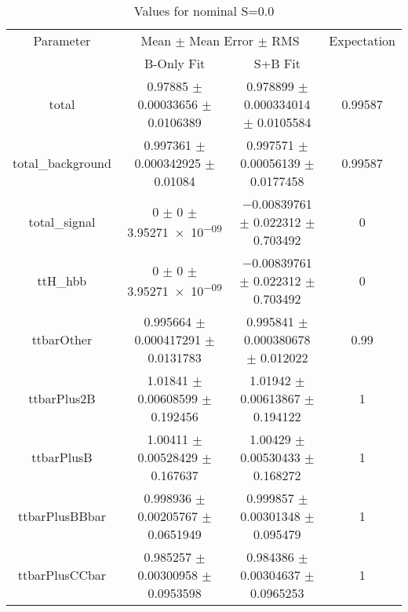 \begin{table}
\centering
\caption{Values for nominal S=0.0}
\begin{tabular}{cccc}
\toprule
Parameter & \multicolumn{2}{c}{Mean $\pm$ Mean Error $\pm$ RMS} & Expectation\\
 & B-Only Fit & S+B Fit & \\
\midrule
total & \num{0.97885} $\pm$ \num{0.00033656} $\pm$ \num{0.0106389} & \num{0.978899} $\pm$ \num{0.000334014} $\pm$ \num{0.0105584} & \num{0.99587}\\
total\_background & \num{0.997361} $\pm$ \num{0.000342925} $\pm$ \num{0.01084} & \num{0.997571} $\pm$ \num{0.00056139} $\pm$ \num{0.0177458} & \num{0.99587}\\
total\_signal & \num{0} $\pm$ \num{0} $\pm$ \num{3.95271e-09} & \num{-0.00839761} $\pm$ \num{0.022312} $\pm$ \num{0.703492} & \num{0}\\
ttH\_hbb & \num{0} $\pm$ \num{0} $\pm$ \num{3.95271e-09} & \num{-0.00839761} $\pm$ \num{0.022312} $\pm$ \num{0.703492} & \num{0}\\
ttbarOther & \num{0.995664} $\pm$ \num{0.000417291} $\pm$ \num{0.0131783} & \num{0.995841} $\pm$ \num{0.000380678} $\pm$ \num{0.012022} & \num{0.99}\\
ttbarPlus2B & \num{1.01841} $\pm$ \num{0.00608599} $\pm$ \num{0.192456} & \num{1.01942} $\pm$ \num{0.00613867} $\pm$ \num{0.194122} & \num{1}\\
ttbarPlusB & \num{1.00411} $\pm$ \num{0.00528429} $\pm$ \num{0.167637} & \num{1.00429} $\pm$ \num{0.00530433} $\pm$ \num{0.168272} & \num{1}\\
ttbarPlusBBbar & \num{0.998936} $\pm$ \num{0.00205767} $\pm$ \num{0.0651949} & \num{0.999857} $\pm$ \num{0.00301348} $\pm$ \num{0.095479} & \num{1}\\
ttbarPlusCCbar & \num{0.985257} $\pm$ \num{0.00300958} $\pm$ \num{0.0953598} & \num{0.984386} $\pm$ \num{0.00304637} $\pm$ \num{0.0965253} & \num{1}\\
\bottomrule
\end{tabular}
\end{table}